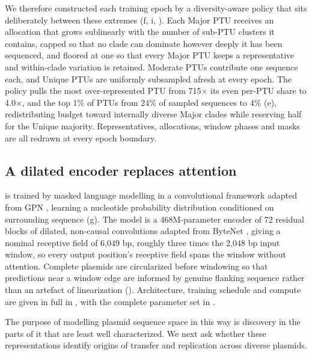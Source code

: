 We therefore constructed each training epoch by a diversity-aware policy that
sits deliberately between these extremes (f,
i, ). Each Major PTU receives an
allocation that grows sublinearly with the number of sub-PTU clusters it
contains, capped so that no clade can dominate however deeply it has been
sequenced, and floored at one so that every Major PTU keeps a representative
and within-clade variation is retained. Moderate PTUs contribute one sequence
each, and Unique PTUs are uniformly subsampled afresh at every epoch. The
policy pulls the most over-represented PTU from 715$\times$ its even per-PTU
share to 4.0$\times$, and the top 1\% of PTUs from 24\% of sampled sequences
to 4\% (e), redistributing budget toward internally
diverse Major clades while reserving half for the Unique majority.
Representatives, allocations, window phases and masks are all redrawn at
every epoch boundary.


\subsection*{A dilated encoder replaces attention}
\label{sec:pretraining}

\model is trained by masked language modelling \cite{devlin2018bert} in a
convolutional framework adapted from GPN \cite{benegas2023dna}, learning a
nucleotide probability distribution conditioned on surrounding sequence
(g). The model is a 468M-parameter encoder of 72
residual blocks of dilated, non-causal convolutions adapted from ByteNet
\cite{kalchbrenner2016neural}, giving a nominal receptive field of 6,049 bp,
roughly three times the 2,048 bp input window, so every output position's
receptive field spans the window without attention. Complete plasmids are circularized before
windowing so that predictions near a window edge are informed by genuine
flanking sequence rather than an artefact of linearization
(). Architecture, training schedule and compute
are given in full in , with the complete parameter set in
.

The purpose of modelling plasmid sequence space in this way is discovery in
the parts of it that are least well characterized. We next ask whether these
representations identify origins of transfer and replication across diverse
plasmids.
